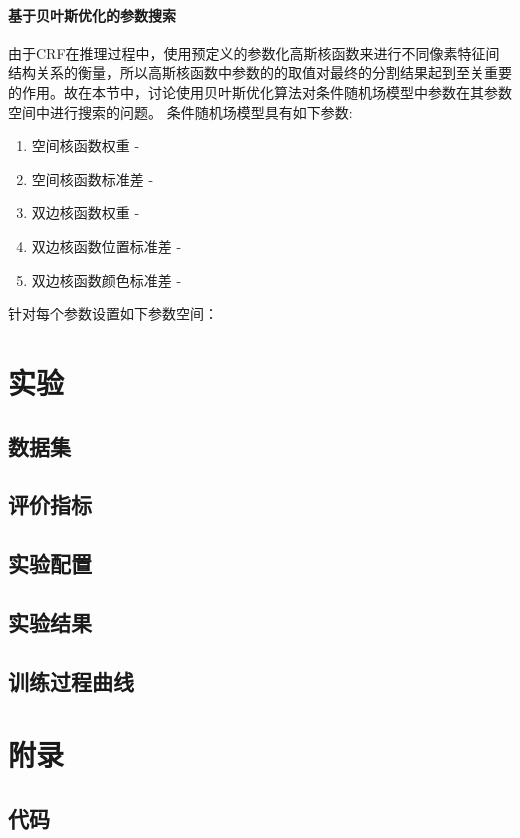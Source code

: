 \documentclass[a4paper,12pt]{ctexart}
\begin{document}
\paragraph{基于贝叶斯优化的参数搜索}
由于CRF在推理过程中，使用预定义的参数化高斯核函数来进行不同像素特征间结构关系的衡量，所以高斯核函数中参数的的取值对最终的分割结果起到至关重要的作用。故在本节中，讨论使用贝叶斯优化算法对条件随机场模型中参数在其参数空间中进行搜索的问题。
条件随机场模型具有如下参数:
\begin{enumerate}
    \item 空间核函数权重 - 
    \item 空间核函数标准差 - 
    \item 双边核函数权重 - 
    \item 双边核函数位置标准差 - 
    \item 双边核函数颜色标准差 - 
\end{enumerate}

针对每个参数设置如下参数空间：

\section{实验}

\subsection{数据集}
\subsection{评价指标}
\subsection{实验配置}
\subsection{实验结果}


\subsection{训练过程曲线}

\section{附录}
\subsection{代码}




\end{document}
